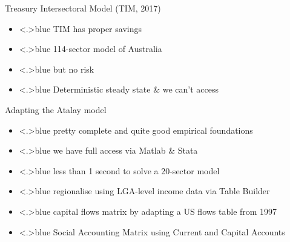 \documentclass[handout,english]{beamer}
\begin{document}
\begin{frame}
  {Treasury Intersectoral Model (TIM, 2017)
  }

\vskip5pt
\vskip5pt
\begin{itemize}
\item<+-|alert@+>{\color<.>{blue}
        TIM has proper savings
        }
\item<+-|alert@+>{\color<.>{blue}
        114-sector model of Australia
        }
\item<+-|alert@+>{\color<.>{blue}
        but no risk
         }
\item<+-|alert@+>{\color<.>{blue}
        Deterministic steady state \& {\color{red} we can't access}
      }
\end{itemize}
  \end{frame}
\begin{frame}
{Adapting the Atalay model}
\begin{itemize}
  \item<+-|alert@+>{\color<.>{blue}
        pretty complete and quite good empirical foundations
        }
  \item<+-|alert@+>{\color<.>{blue}
        {\color{patrickcolor3} we have full access via Matlab \& Stata}
        }
\end{itemize}
\begin{itemize}
  \item<+-|alert@+>{\color<.>{blue}
        less than 1 second to solve a 20-sector model
        }

  \item<+-|alert@+>{\color<.>{blue}
        regionalise using LGA-level income data via Table Builder
        }
  \item<+-|alert@+>{\color<.>{blue}
        capital flows matrix by adapting a US flows table from 1997 \RKconfused\
        }
  \item<+-|alert@+>{\color<.>{blue}
        Social Accounting Matrix using Current and Capital Accounts}
\end{itemize}
  \end{frame}
\end{document}
